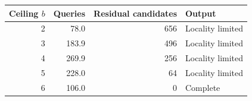 \begin{tabular}{rrrl}
\toprule
Ceiling $b$ & Queries & Residual candidates & Output \\
\midrule
2 & 78.0 & 656 & Locality limited \\
3 & 183.9 & 496 & Locality limited \\
4 & 269.9 & 256 & Locality limited \\
5 & 228.0 & 64 & Locality limited \\
6 & 106.0 & 0 & Complete \\
\bottomrule
\end{tabular}
